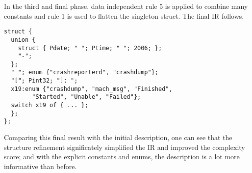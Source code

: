 

In the third and final phase, 
data independent rule 5  is applied to combine many constants 
and rule 1 is used to flatten the singleton struct. The final IR follows.

{\small
\begin{verbatim}
struct {
  union {
    struct { Pdate; " "; Ptime; " "; 2006; };
    "-";
  };
  " "; enum {"crashreporterd", "crashdump"};
  "["; Pint32; "]: ";
  x19:enum {"crashdump", "mach_msg", "Finished", 
        "Started", "Unable", "Failed"};
  switch x19 of { ... };
  };
};
\end{verbatim}
}



Comparing this final result with the initial description, one can see that
the structure refinement significately simplified the IR and improved the
complexity score; and with
the explicit constants and enums, the description is a lot more
informative than before.
